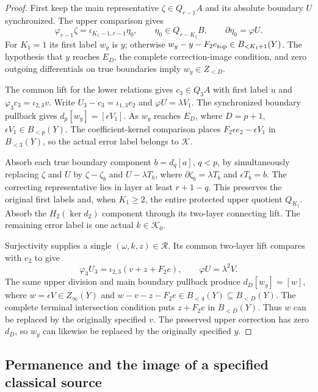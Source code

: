 \begin{proof}
First keep the main representative $\zeta\in Q_{r-1}A$ and its
absolute boundary $U$ synchronized. The upper comparison gives
\[
\varphi_{r-1}\zeta=\iota_{K_1-1,r-1}\eta_0,\qquad
\eta_0\in Q_{r-K_1}B,\qquad \partial\eta_0=\varphi U.
\]
For $K_1=1$ its first label $w_y$ is $y$; otherwise
$w_y-y-F_2e_{\rm top}\in B_{<K_1+1}(Y)$.
The hypothesis that $y$ reaches $E_D$, the complete correction-image
condition, and zero outgoing differentials on true boundaries imply
$w_y\in Z_{<D}$.

The common lift for the lower relations gives $c_3\in Q_3A$ with first label $u$
and $\varphi_3c_3=\iota_{2,3}v$. Write
$U_3-c_3=\iota_{1,3}e_2$ and $\varphi U=\lambda V_1$.
The synchronized boundary pullback gives
$d_p[w_y]=[\epsilon V_1]$. As $w_y$ reaches $E_D$, where $D=p+1$,
$\epsilon V_1\in B_{<p}(Y)$. The coefficient-kernel comparison
places $F_2\epsilon e_2-\epsilon V_1$ in $B_{<3}(Y)$, so the
actual error label belongs to $\mathcal K$.

Absorb each true boundary component $b=d_q[a]$, $q<p$, by
simultaneously replacing $\zeta$ and $U$ by
$\zeta-\zeta_b$ and $U-\lambda T_b$, where
$\partial\zeta_b=\lambda T_b$ and $\epsilon T_b=b$.
The correcting representative lies in layer at least $r+1-q$.
This preserves the original first labels and, when $K_1\ge2$,
the entire protected upper quotient $Q_{K_1}$.
Absorb the $H_2(\ker d_2)$ component through its two-layer
connecting lift. The remaining error label is one actual
$k\in\mathcal K_0$.

Surjectivity supplies a single $(\omega,k,z)\in\mathcal R$.
Its common two-layer lift compares with $e_2$ to give
\[
\varphi_3U_3=\iota_{2,3}(v+z+F_2e),\qquad
\varphi U=\lambda^2V.
\]
The same upper division and main boundary pullback produce
$d_D[w_y]=[w]$, where $w=\epsilon V\in Z_\infty(Y)$ and
$w-v-z-F_2e\in B_{<4}(Y)\subseteq B_{<D}(Y)$.
The complete terminal intersection condition puts $z+F_2e$
in $B_{<D}(Y)$. Thus $w$ can be replaced by the originally
specified $v$. The preserved upper correction has zero $d_D$,
so $w_y$ can likewise be replaced by the originally specified $y$.
\end{proof}


\subsection{Permanence and the image of a specified classical source}

